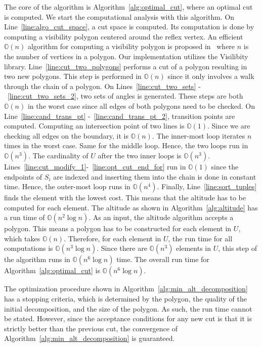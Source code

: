 \documentclass[../main.tex]{subfiles}
\begin{document}
The core of the algorithm is Algorithm~\ref{alg:optimal_cut}, where an optimal cut is computed. We start the computational analysis with this algorithm. On Line~\ref{line:algo_cut_space}, a cut space is computed. Its computation is done by computing a visibility polygon centered around the reflex vertex. An efficient $\mathbb{O}(n)$ algorithm for computing a visibility polygon is proposed in~\cite{el1981linear} where $n$ is the number of vertices in a polygon. Our implementation utilizes the Visilibity~\cite{VisiLibity:08} library. Line~\ref{line:cut_two_polygons} performs a cut of a polygon resulting in two new polygons. This step is performed in $\mathbb{O}(n)$ since it only involves a walk through the chain of a polygon. On Lines~\ref{line:cut_two_sets} -~\ref{line:cut_two_sets_2}, two sets of angles is generated. These steps are both $\mathbb{O}(n)$ in the worst case since all edges of both polygons need to be checked. On Line~\ref{line:cand_trans_pt} -~\ref{line:cand_trans_pt_2}, transition points are computed. Computing an intersection point of two lines is $\mathbb{O}(1)$. Since we are checking all edges on the boundary, it is $\mathbb{O}(n)$. The inner-most loop iterates $n$ times in the worst case. Same for the middle loop. Hence, the two loops run in $\mathbb{O}(n^3)$. The cardinality of $U$ after the two inner loops is $\mathbb{O}(n^3)$. Lines~\ref{line:cut_modify_1}-~\ref{line:opt_cut_end_for} run in $\mathbb{O}(1)$ since the endpoints of $S_i$ are indexed and inserting them into the chain is done in constant time.  Hence, the outer-most loop runs in $\mathbb{O}(n^4)$. Finally, Line~\ref{line:sort_tuples} finds the element with the lowest cost. This means that the altitude has to be computed for each element. The altitude as shown in Algorithm~\ref{alg:altitude} has a run time of $\mathbb{O}(n^2\log{n})$. As an input, the altitude algorithm accepts a polygon. This means a polygon has to be constructed for each element in $U$, which takes $\mathbb{O}(n)$. Therefore, for each element in $U$, the run time for all computations is $\mathbb{O}(n^3\log{n})$. Since there are $\mathbb{O}(n^3)$ elements in $U$, this step of the algorithm runs in $\mathbb{O}(n^6\log{n})$ time. The overall run time for Algorithm~\ref{alg:optimal_cut} is $\mathbb{O}(n^6\log{n})$.

The optimization procedure shown in Algorithm~\ref{alg:min_alt_decomposition} has a stopping criteria, which is determined by the polygon, the quality of the initial decomposition, and the size of the polygon. As such, the run time cannot be stated. However, since the acceptance conditions for any new cut is that it is strictly better than the previous cut, the convergence of Algorithm~\ref{alg:min_alt_decomposition} is guaranteed.
\end{document}
